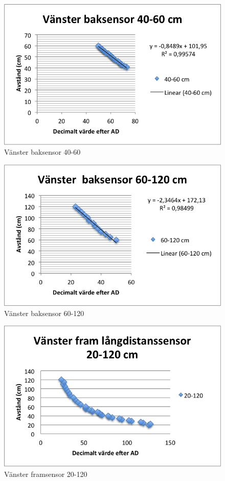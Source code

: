 \begin{figure}[H]
  \centering
 \includegraphics[angle=0,scale=1]{bilder/VB_40_60.png}
  \caption{Vänster baksensor 40-60}
\end{figure}

\begin{figure}[H]
  \centering
 \includegraphics[angle=0,scale=1]{bilder/VB_60_120.png}
  \caption{Vänster baksensor 60-120}
\end{figure}

\begin{figure}[H]
  \centering
 \includegraphics[angle=0,scale=1]{bilder/VF_20_120.png}
  \caption{Vänster framsensor 20-120}
\end{figure}

